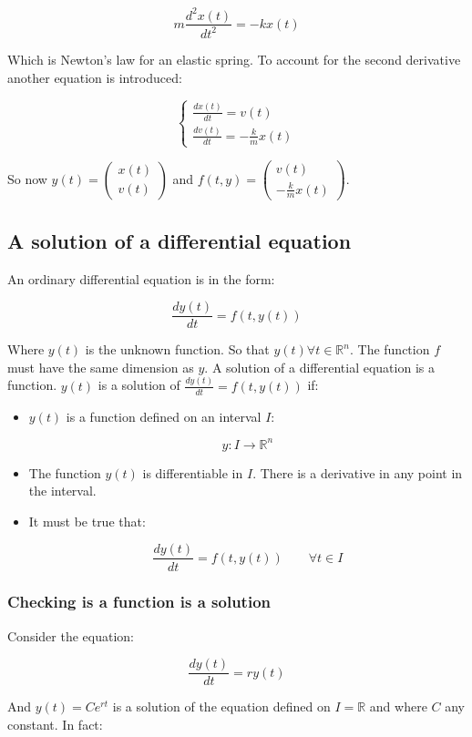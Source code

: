 	$$m\frac{d^2x(t)}{dt^2} = -kx(t)$$

	Which is Newton's law for an elastic spring.
	To account for the second derivative another equation is introduced:

	$$\begin{cases} \frac{dx(t)}{dt} = v(t)\\\frac{dv(t)}{dt} = -\frac{k}{m}x(t)\end{cases}$$

	So now $y(t) = \begin{pmatrix}x(t)\\v(t)\end{pmatrix}$ and $f(t,y) = \begin{pmatrix}v(t)\\-\frac{k}{m}x(t)\end{pmatrix}$.

	\subsection{A solution of a differential equation}
	An ordinary differential equation is in the form:

	$$\frac{dy(t)}{dt} = f(t, y(t))$$

	Where $y(t)$ is the unknown function.
	So that $y(t)\forall t\in \mathbb{R}^n$.
	The function $f$ must have the same dimension as $y$.
	A solution of a differential equation is a function.
	$y(t)$ is a solution of $\frac{dy(t)}{dt} = f(t, y(t))$ if:

	\begin{itemize}
		\item $y(t)$ is a function defined on an interval $I$:

			$$y:I\to \mathbb{R}^n$$

		\item The function $y(t)$ is differentiable in $I$.
			There is a derivative in any point in the interval.
		\item It must be true that:

			$$\frac{dy(t)}{dt} = f(t, y(t))\qquad \forall t\in I$$
	\end{itemize}

		\subsubsection{Checking is a function is a solution}
		Consider the equation:

		$$\frac{dy(t)}{dt} = ry(t)$$

		And $y(t) = Ce^{rt}$ is a solution of the equation defined on $I=\mathbb{R}$ and where $C$ any constant.
		In fact:


